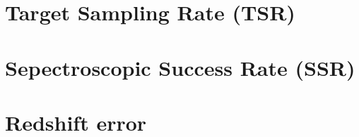\documentclass[a4paper,11pt]{article}
\begin{document}
\section{Target Sampling Rate (TSR)}
\label{section:tsr}

\section{Sepectroscopic Success Rate (SSR)}
\label{section:ssr}

\section{Redshift error}
\label{section:zerror}






\label{LastPage}
\end{document}
